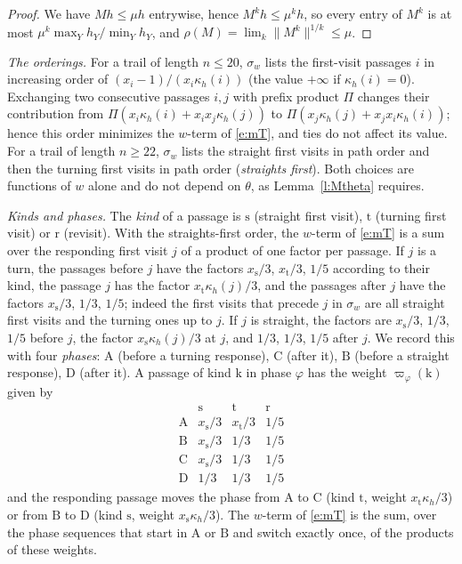 \begin{proof}
We have $M h \le \mu h$ entrywise, hence $M^k h \le \mu^k h$, so every entry of $M^k$ is at most $\mu^k \max_Y h_Y / \min_Y h_Y$, and $\rho(M) = \lim_k \|M^k\|^{1/k} \le \mu$.
\end{proof}

\emph{The orderings.} For a trail of length $n \le 20$, $\sigma_w$ lists the first-visit passages $i$ in increasing order of $(x_i - 1)/(x_i \kappa_h(i))$ (the value $+\infty$ if $\kappa_h(i) = 0$). Exchanging two consecutive passages $i, j$ with prefix product $\Pi$ changes their contribution from $\Pi (x_i \kappa_h(i) + x_i x_j \kappa_h(j))$ to $\Pi (x_j \kappa_h(j) + x_j x_i \kappa_h(i))$; hence this order minimizes the $w$-term of \eqref{e:mT}, and ties do not affect its value. For a trail of length $n \ge 22$, $\sigma_w$ lists the straight first visits in path order and then the turning first visits in path order (\emph{straights first}). Both choices are functions of $w$ alone and do not depend on $\theta$, as Lemma~\ref{l:Mtheta} requires.

\emph{Kinds and phases.} The \emph{kind} of a passage is $\mathrm s$ (straight first visit), $\mathrm t$ (turning first visit) or $\mathrm r$ (revisit). With the straights-first order, the $w$-term of \eqref{e:mT} is a sum over the responding first visit $j$ of a product of one factor per passage. If $j$ is a turn, the passages before $j$ have the factors $x_{\mathrm s}/3$, $x_{\mathrm t}/3$, $1/5$ according to their kind, the passage $j$ has the factor $x_{\mathrm t} \kappa_h(j)/3$, and the passages after $j$ have the factors $x_{\mathrm s}/3$, $1/3$, $1/5$; indeed the first visits that precede $j$ in $\sigma_w$ are all straight first visits and the turning ones up to $j$. If $j$ is straight, the factors are $x_{\mathrm s}/3$, $1/3$, $1/5$ before $j$, the factor $x_{\mathrm s} \kappa_h(j)/3$ at $j$, and $1/3$, $1/3$, $1/5$ after $j$. We record this with four \emph{phases}: $\mathrm A$ (before a turning response), $\mathrm C$ (after it), $\mathrm B$ (before a straight response), $\mathrm D$ (after it). A passage of kind $\mathrm k$ in phase $\varphi$ has the weight $\varpi_\varphi(\mathrm k)$ given by
\begin{equation}\label{e:phaseweights}
\begin{array}{c|ccc}
 & \mathrm s & \mathrm t & \mathrm r \\ \hline
\mathrm A & x_{\mathrm s}/3 & x_{\mathrm t}/3 & 1/5 \\
\mathrm B & x_{\mathrm s}/3 & 1/3 & 1/5 \\
\mathrm C & x_{\mathrm s}/3 & 1/3 & 1/5 \\
\mathrm D & 1/3 & 1/3 & 1/5
\end{array}
\end{equation}
and the responding passage moves the phase from $\mathrm A$ to $\mathrm C$ (kind $\mathrm t$, weight $x_{\mathrm t} \kappa_h/3$) or from $\mathrm B$ to $\mathrm D$ (kind $\mathrm s$, weight $x_{\mathrm s} \kappa_h/3$). The $w$-term of \eqref{e:mT} is the sum, over the phase sequences that start in $\mathrm A$ or $\mathrm B$ and switch exactly once, of the products of these weights.

